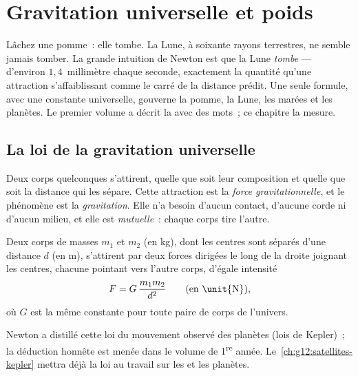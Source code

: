 \chapter{Gravitation universelle et poids}\label{ch:g10:universal-gravitation}

Lâchez une pomme~: elle tombe. La Lune, à soixante rayons terrestres,
ne semble jamais tomber. La grande intuition de Newton est que la Lune
\emph{tombe} --- d'environ $1{,}4$~millimètre chaque seconde, exactement
la quantité qu'une attraction s'affaiblissant comme le carré de la
distance prédit. Une seule formule, avec une constante universelle,
gouverne la pomme, la Lune, les marées et les planètes. Le premier
volume a décrit la  avec des mots~; ce chapitre la
mesure.

\section{La loi de la gravitation universelle}

\begin{definition}\label{def:g10:universal-gravitation:force}
Deux corps quelconques s'attirent, quelle que soit leur composition et
quelle que soit la distance qui les sépare. Cette attraction est la
\emph{force gravitationnelle}, et le
phénomène est la \emph{gravitation}. Elle n'a besoin
d'aucun contact, d'aucune corde ni d'aucun milieu, et elle est
\emph{mutuelle}~: chaque corps tire l'autre.
\end{definition}

\begin{theorem}\label{thm:g10:universal-gravitation:law}
Deux corps de masses $m_1$ et $m_2$ (en \unit{kg}), dont les centres
sont séparés d'une distance $d$ (en \unit{m}), s'attirent par deux
forces dirigées le long de la droite joignant les centres, chacune
pointant vers l'autre corps, d'égale intensité
\[
F = G\,\frac{m_1 m_2}{d^2}
\qquad \text{(en \unit{N})},
\]
où $G$ est la même constante pour toute paire de corps de l'univers.
\end{theorem}
\admitted

\begin{remark}
Newton a distillé cette loi du mouvement observé des planètes (lois de
Kepler)~; la déduction honnête est menée dans le volume de
1\textsuperscript{re} année. Le~\cref{ch:g12:satellites-kepler}
mettra déjà la loi au travail sur les  et les planètes.
\end{remark}

